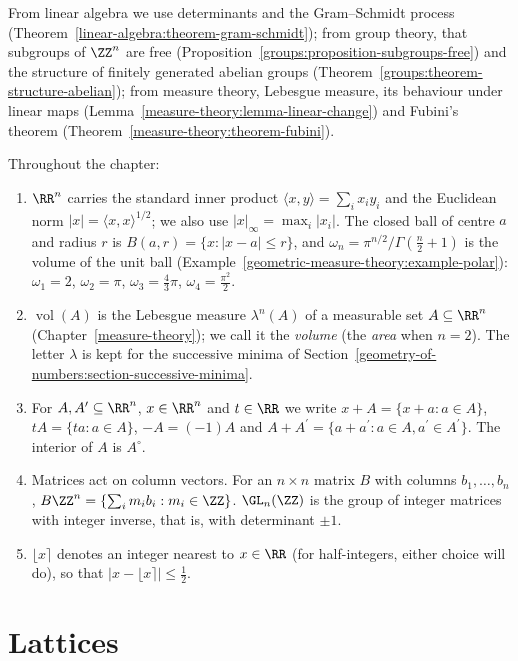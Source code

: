 From linear algebra we use determinants and the Gram--Schmidt process (Theorem~\ref{linear-algebra:theorem-gram-schmidt}); from group theory, that subgroups of $\ZZ^n$ are free
(Proposition~\ref{groups:proposition-subgroups-free}) and the structure of finitely generated abelian groups (Theorem~\ref{groups:theorem-structure-abelian}); from measure theory, Lebesgue
measure, its behaviour under linear maps (Lemma~\ref{measure-theory:lemma-linear-change}) and Fubini's theorem (Theorem~\ref{measure-theory:theorem-fubini}).

\begin{notation}\label{geometry-of-numbers:notation-basic}
Throughout the chapter:
\begin{enumerate}
\item $\RR^n$ carries the standard inner product $\langle x, y \rangle = \sum_i x_iy_i$ and the Euclidean norm $|x| = \langle x, x \rangle^{1/2}$; we also use $|x|_\infty = \max_i|x_i|$. The closed
ball of centre $a$ and radius $r$ is $B(a, r) = \{x : |x - a| \leq r\}$, and $\omega_n = \pi^{n/2}/\Gamma(\frac n2 + 1)$ is the volume of the unit ball (Example~\ref{geometric-measure-theory:example-polar}):
$\omega_1 = 2$, $\omega_2 = \pi$, $\omega_3 = \frac43\pi$, $\omega_4 = \frac{\pi^2}{2}$.
\item $\operatorname{vol}(A)$ is the Lebesgue measure $\lambda^n(A)$ of a measurable set $A \subseteq \RR^n$ (Chapter~\ref{measure-theory}); we call it the \emph{volume} (the \emph{area} when $n = 2$).
The letter $\lambda$ is kept for the successive minima of Section~\ref{geometry-of-numbers:section-successive-minima}.
\item For $A, A^{\prime} \subseteq \RR^n$, $x \in \RR^n$ and $t \in \RR$ we write $x + A = \{x + a : a \in A\}$, $tA = \{ta : a \in A\}$, $-A = (-1)A$ and
$A + A^{\prime} = \{a + a^{\prime} : a \in A, a^{\prime} \in A^{\prime}\}$. The interior of $A$ is $A^\circ$.
\item Matrices act on column vectors. For an $n \times n$ matrix $B$ with columns $b_1, \ldots, b_n$, $B\ZZ^n = \{\sum_im_ib_i : m_i \in \ZZ\}$. $\GL_n(\ZZ)$ is the group of integer matrices with
integer inverse, that is, with determinant $\pm1$.
\item $\lfloor x \rceil$ denotes an integer nearest to $x \in \RR$ (for half-integers, either choice will do), so that $|x - \lfloor x \rceil| \leq \frac12$.
\end{enumerate}
\end{notation}

\section{Lattices}\label{geometry-of-numbers:section-lattices}

